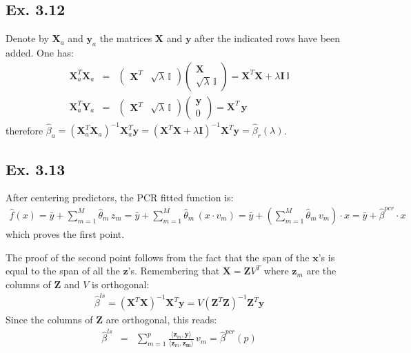 \subsection*{Ex. 3.12}
Denote by $\mathbf{X}_a$ and $\mathbf{y}_a$ the matrices $\mathbf{X}$ and $\mathbf{y}$ after the indicated
rows have been added. One has:
\begin{eqnarray*}
\mathbf{X}_a^T \mathbf{X}_a & = & \left( \begin{array}{cc}  \mathbf{X}^T  & \sqrt{\lambda}\, \mathbb{I}  \end{array}\right) \left( \begin{array}{c} \mathbf{X} \\ \sqrt{\lambda}\, \mathbb{I} \end{array} \right) = \mathbf{X}^T \mathbf{X} + \lambda \mathbf{I}\, \mathbb{I} \\
\mathbf{X}_a^T \mathbf{Y}_a & = & \left( \begin{array}{cc}  \mathbf{X}^T  & \sqrt{\lambda}\, \mathbb{I}  \end{array}\right) \left( \begin{array}{c} \mathbf{y} \\ 0 \end{array} \right) = \mathbf{X}^T \, \mathbf{y}
\end{eqnarray*}
therefore $\hat{\beta}_a = \left( \mathbf{X}_a^T \mathbf{X}_a \right)^{-1} \mathbf{X}_a^T \mathbf{y} =  \left( \mathbf{X}^T \mathbf{X} + \lambda \mathbf{I} \right)^{-1} \mathbf{X}^T \mathbf{y} = \hat{\beta}_{r}(\lambda)$.

\subsection*{Ex. 3.13}
After centering predictors, the PCR fitted function is:
\begin{eqnarray*}
\hat{f}(x) = \bar{y} +\sum_{m=1}^M \hat{\theta}_m \, z_m = \bar{y} + \sum_{m=1}^M \hat{\theta}_m \, (x \cdot v_m) = \bar{y} + \left( \sum_{m=1}^M \hat{\theta}_m \, v_m\right) \cdot x = \bar{y} + \hat{\beta}^{pcr} \cdot x
\end{eqnarray*} 
which proves the first point.

The proof of the second point follows from the fact that the span of the $\mathbf{x}$'s is equal to
the span of all the $\mathbf{z}$'s. Remembering that $\mathbf{X} = \mathbf{Z}V^T$ where $\mathbf{z}_m$ are the columns of $\mathbf{Z}$ and $V$ is orthogonal:
\begin{eqnarray*}
\hat{\beta}^{ls}  =  \left( \mathbf{X}^T \mathbf{X} \right)^{-1} \mathbf{X}^T \mathbf{y} =
 V \left( \mathbf{Z}^T \mathbf{Z} \right)^{-1} \mathbf{Z}^T \mathbf{y}
\end{eqnarray*}
Since the columns of $\mathbf{Z}$ are orthogonal, this reads:
\begin{eqnarray*}
\hat{\beta}^{ls} & = & \sum_{m=1}^{p} \frac{\langle \mathbf{z}_m, \mathbf{y} \rangle}{\langle \mathbf{z}_m, \mathbf{z_m} \rangle} \, v_m = \hat{\beta}^{pcr}(p)
\end{eqnarray*}

